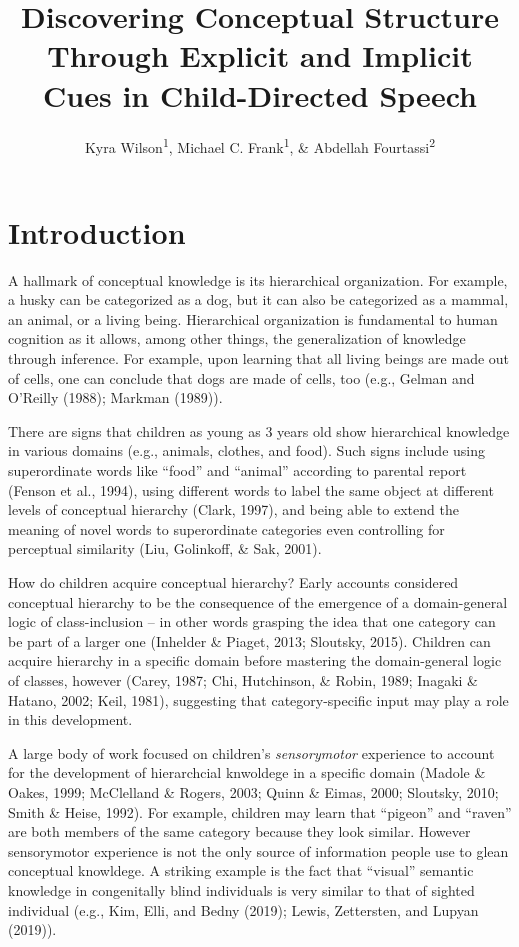 \documentclass[english,,man,floatsintext]{apa6}
\title{Discovering Conceptual Structure Through Explicit and Implicit Cues in Child-Directed Speech}
\author{Kyra Wilson\textsuperscript{1}, Michael C. Frank\textsuperscript{1}, \& Abdellah Fourtassi\textsuperscript{2}}
\date{}
\affiliation{\vspace{0.5cm}\textsuperscript{1} Department of Psychology, Stanford University\\\textsuperscript{2} Department of Computer Science, Aix-Marseille University}
\begin{document}
\maketitle

\hypertarget{introduction}{%
\section{Introduction}\label{introduction}}

A hallmark of conceptual knowledge is its hierarchical organization. For example, a husky can be categorized as a dog, but it can also be categorized as a mammal, an animal, or a living being. Hierarchical organization is fundamental to human cognition as it allows, among other things, the generalization of knowledge through inference. For example, upon learning that all living beings are made out of cells, one can conclude that dogs are made of cells, too (e.g., Gelman and O'Reilly (1988); Markman (1989)).

There are signs that children as young as 3 years old show hierarchical knowledge in various domains (e.g., animals, clothes, and food). Such
signs include using superordinate words like \enquote{food} and \enquote{animal} according to parental report (Fenson et al., 1994), using different words to label the same object at different levels of conceptual hierarchy (Clark, 1997), and being able to extend the meaning of novel words to superordinate categories even controlling for perceptual similarity (Liu, Golinkoff, \& Sak, 2001).

How do children acquire conceptual hierarchy? Early accounts considered
conceptual hierarchy to be the consequence of the emergence of a
domain-general logic of class-inclusion -- in other words grasping the idea that one category can be part of a larger one
(Inhelder \& Piaget, 2013; Sloutsky, 2015). Children can acquire hierarchy in a specific domain before mastering the domain-general logic of classes, however (Carey, 1987; Chi, Hutchinson, \& Robin, 1989; Inagaki \& Hatano, 2002; Keil, 1981), suggesting that category-specific input may play a role in this development.

A large body of work focused on children's \emph{sensorymotor} experience to account for the development of hierarchcial knwoldege in a specific domain (Madole \& Oakes, 1999; McClelland \& Rogers, 2003; Quinn \& Eimas, 2000; Sloutsky, 2010; Smith \& Heise, 1992). For example, children may learn that \enquote{pigeon} and \enquote{raven} are both members of the same category because they look similar. However sensorymotor experience is not the only source of information people use to glean conceptual knowldege. A striking example is the fact that \enquote{visual} semantic knowledge in congenitally blind individuals is very similar to that of sighted individual (e.g., Kim, Elli, and Bedny (2019); Lewis, Zettersten, and Lupyan (2019)).
\end{document}
